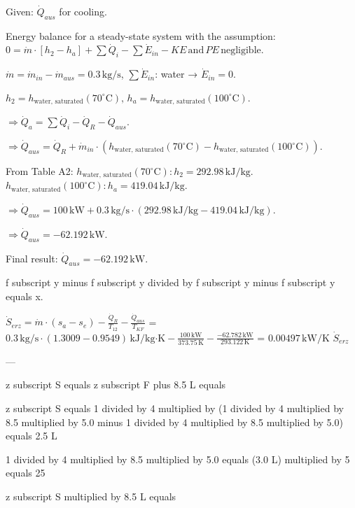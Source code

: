 Given: \( \dot{Q}_{aus} \) for cooling.  

Energy balance for a steady-state system with the assumption:  
\( 0 = \dot{m} \cdot [h_2 - h_a] + \sum \dot{Q}_i - \sum \dot{E}_{in} - KE \, \text{and} \, PE \, \text{negligible} \).  

\( \dot{m} = \dot{m}_{in} - \dot{m}_{aus} = 0.3 \, \text{kg/s} \), \( \sum \dot{E}_{in} \): water → \( \dot{E}_{in} = 0 \).  

\( h_2 = h_{\text{water, saturated}}(70^\circ \text{C}), \, h_a = h_{\text{water, saturated}}(100^\circ \text{C}) \).  

\( \Rightarrow \dot{Q}_a = \sum \dot{Q}_i - \dot{Q}_R - \dot{Q}_{aus} \).  

\( \Rightarrow \dot{Q}_{aus} = \dot{Q}_R + \dot{m}_{in} \cdot (h_{\text{water, saturated}}(70^\circ \text{C}) - h_{\text{water, saturated}}(100^\circ \text{C})) \).  

From Table A2:  
\( h_{\text{water, saturated}}(70^\circ \text{C}): h_2 = 292.98 \, \text{kJ/kg} \).  
\( h_{\text{water, saturated}}(100^\circ \text{C}): h_a = 419.04 \, \text{kJ/kg} \).  

\( \Rightarrow \dot{Q}_{aus} = 100 \, \text{kW} + 0.3 \, \text{kg/s} \cdot (292.98 \, \text{kJ/kg} - 419.04 \, \text{kJ/kg}) \).  

\( \Rightarrow \dot{Q}_{aus} = -62.192 \, \text{kW} \).  

Final result: \( \dot{Q}_{aus} = -62.192 \, \text{kW} \).

f subscript y minus f subscript y divided by f subscript y minus f subscript y equals x.

\( \dot{S}_{erz} = \dot{m} \cdot (s_a - s_e) - \frac{\dot{Q}_R}{T_{12}} - \frac{\dot{Q}_{aus}}{T_{KF}} \)  
= \( 0.3 \, \text{kg/s} \cdot (1.3009 - 0.9549) \, \text{kJ/kg·K} - \frac{100 \, \text{kW}}{373.75 \, \text{K}} - \frac{-62.782 \, \text{kW}}{293.122 \, \text{K}} \)  
= \( 0.00497 \, \text{kW/K} \)  
\( \dot{S}_{erz} \)  

---

z subscript S equals z subscript F plus 8.5 L equals  

z subscript S equals 1 divided by 4 multiplied by (1 divided by 4 multiplied by 8.5 multiplied by 5.0 minus 1 divided by 4 multiplied by 8.5 multiplied by 5.0) equals 2.5 L  

1 divided by 4 multiplied by 8.5 multiplied by 5.0 equals (3.0 L) multiplied by 5 equals 25  

z subscript S multiplied by 8.5 L equals  

